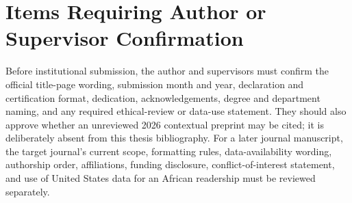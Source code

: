 \section{Items Requiring Author or Supervisor Confirmation}

Before institutional submission, the author and supervisors must confirm the official title-page wording, submission month and year, declaration and certification format, dedication, acknowledgements, degree and department naming, and any required ethical-review or data-use statement. They should also approve whether an unreviewed 2026 contextual preprint may be cited; it is deliberately absent from this thesis bibliography. For a later journal manuscript, the target journal's current scope, formatting rules, data-availability wording, authorship order, affiliations, funding disclosure, conflict-of-interest statement, and use of United States data for an African readership must be reviewed separately.
